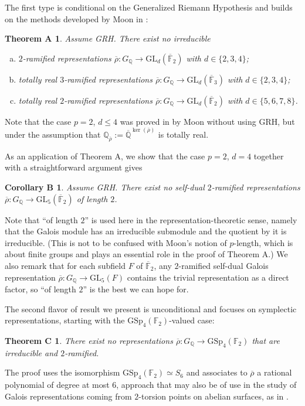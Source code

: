 \documentclass{amsart}
\newtheorem*{theoremA}{Theorem A}
\newtheorem*{corB}{Corollary B}
\newtheorem*{theoremC}{Theorem C}
\theoremstyle{definition}
\newcommand{\lra}{\longrightarrow}
\newcommand{\Q}{\mathbb{Q}}
\newcommand{\F}{\mathbb{F}}
\newcommand{\bQ}{\overline{{\Q}}}
\newcommand{\bF}{\overline{\F}}
\newcommand{\br}{\overline{\rho}}
\newcommand{\GSp}{\mathrm{GSp}}
\newcommand{\GL}{\mathrm{GL}}
\renewcommand{\leq}{\leqslant}
\begin{document}
The first type is conditional on the Generalized Riemann Hypothesis and builds on the methods developed by Moon in \cite{Mo1,Mo2}:
\begin{theoremA}
  Assume GRH.
  There exist no irreducible
  \begin{enumerate}[(a)]
    \item  $2$-ramified representations $\br:G_\Q\lra\GL_d(\bF_2)$ with $d\in\{2,3,4\}$;

    \item totally real $3$-ramified representations $\br:G_\Q\lra\GL_d(\bF_3)$ with $d\in\{2,3,4\}$;

    \item totally real $2$-ramified representations $\br:G_\Q\lra\GL_d(\bF_2)$ with $d\in\{5,6,7,8\}$.
  \end{enumerate}
\end{theoremA}
Note that the case $p=2$, $d\leq 4$ was proved in \cite{Mo2} by Moon without using GRH, but under the assumption that $\Q_{\br}:=\bQ^{\ker(\br)}$ is totally real.

As an application of Theorem A, we show that the case $p=2$, $d=4$ together with a straightforward argument gives
\begin{corB}
  Assume GRH.
  There exist no self-dual $2$-ramified representations $\br:G_\Q\lra \GL_5(\bF_2)$ of length $2$.
\end{corB}
Note that ``of length $2$'' is used here in the representation-theoretic sense, namely that the Galois module has an irreducible submodule and the quotient by it is irreducible.
(This is not to be confused with Moon's notion of $p$-length, which is about finite groups and plays an essential role in the proof of Theorem A.)
We also remark that for each subfield $F$ of $\bF_2$, any $2$-ramified self-dual Galois representation $\br:G_\Q\lra \GL_5(F)$ contains the trivial representation as a direct factor, so ``of length $2$'' is the best we can hope for.

The second flavor of result we present is unconditional and focuses on symplectic representations, starting with the $\GSp_4(\F_2)$-valued case:
\begin{theoremC}
  There exist no representations $\br:G_\Q\lra \GSp_4(\F_2)$ that are irreducible and $2$-ramified.
\end{theoremC}
The proof uses the isomorphism $\GSp_4(\F_2)\simeq S_6$ and associates to $\br$ a rational polynomial of degree at most $6$, approach that may also be of use in the study of Galois representations coming from $2$-torsion points on abelian surfaces, as in \cite{GY}.
\end{document}
